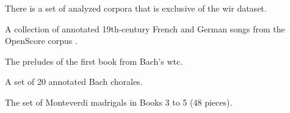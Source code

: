 

There is a set of analyzed corpora that is exclusive of the \gls{wir} dataset.


A collection of annotated 19th-century French and German
songs from the OpenScore corpus
\textcite{gotham2022openscore}.


The preludes of the first book from Bach's \gls{wtc}. 


A set of 20 annotated Bach chorales. 


The set of Monteverdi madrigals in Books 3 to 5 (48 pieces).

